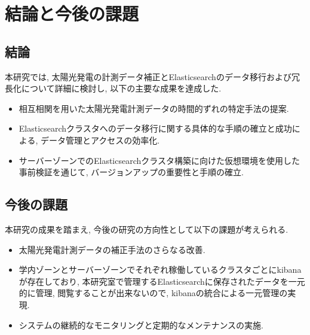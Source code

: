 \chapter{結論と今後の課題}
\label{chap:fifth}

\section{結論}
本研究では, 太陽光発電の計測データ補正とElasticsearchのデータ移行および冗長化について詳細に検討し, 以下の主要な成果を達成した.




\begin{itemize}
  \item 相互相関を用いた太陽光発電計測データの時間的ずれの特定手法の提案.
  \item Elasticsearchクラスタへのデータ移行に関する具体的な手順の確立と成功による, データ管理とアクセスの効率化.
  \item サーバーゾーンでのElasticsearchクラスタ構築に向けた仮想環境を使用した事前検証を通じて, バージョンアップの重要性と手順の確立.
\end{itemize}

\section{今後の課題}
本研究の成果を踏まえ, 今後の研究の方向性として以下の課題が考えられる.

\begin{itemize}
  \item 太陽光発電計測データの補正手法のさらなる改善.
  \item 学内ゾーンとサーバーゾーンでそれぞれ稼働しているクラスタごとにkibanaが存在しており, 本研究室で管理するElasticsearchに保存されたデータを一元的に管理, 閲覧することが出来ないので, kibanaの統合による一元管理の実現.
  \item システムの継続的なモニタリングと定期的なメンテナンスの実施.
\end{itemize}
